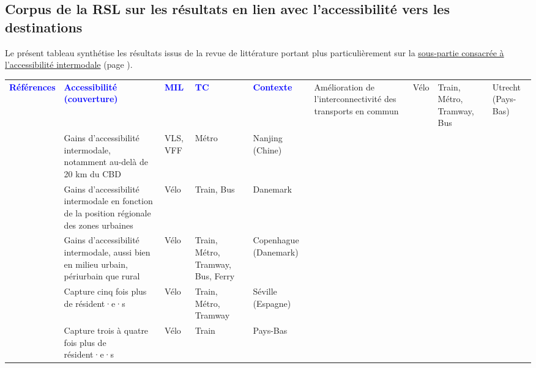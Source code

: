     \newpage
\subsection{Corpus de la \acrshort{RSL} sur les résultats en lien avec l'\gls{accessibilité} vers les destinations}
    \label{donnees-ouvertes:rsl_resultats_accessibilite_destinations}

Le présent tableau synthétise les résultats issus de la revue de littérature portant plus particulièrement sur la \hyperref[Accessibilité intermodale]{sous-partie consacrée à l'accessibilité intermodale} (page \pageref{Accessibilité intermodale}).\par

        \begin{longtable}{p{3cm}p{4cm}p{1.5cm}p{1.8cm}p{2.3cm}}
        \hline
        \textcolor{blue}{\textbf{Références}} & \textcolor{blue}{\textbf{Accessibilité (couverture)}} & \textcolor{blue}{\textbf{MIL}} & \textcolor{blue}{\textbf{TC}} & \textcolor{blue}{\textbf{Contexte}}
        \hline
        \endhead
    \small{\textcite{krygsman_multimodal_2004}} & \small{Amélioration de l'interconnectivité des transports en commun} & \small{Vélo} & \small{Train, Métro, Tramway, Bus} & \small{Utrecht (Pays-Bas)}\\
    \small{\textcite{cheng_comparison_2023}} & \small{Gains d'accessibilité intermodale, notamment au-delà de 20 km du \acrshort{CBD}} & \small{VLS, VFF} & \small{Métro} & \small{Nanjing (Chine)}\\
    \small{\textcite{nielsen_bikeability_2018}} & \small{Gains d'accessibilité intermodale en fonction de la position régionale des zones urbaines} & \small{Vélo} & \small{Train, Bus} & \small{Danemark}\\
    \small{\textcite{djurhuus_building_2016}} & \small{Gains d'accessibilité intermodale, aussi bien en milieu urbain, périurbain que rural} & \small{Vélo} & \small{Train, Métro, Tramway, Bus, Ferry} & \small{Copenhague (Danemark)}\\
    \small{\textcite{marques_potential_2017}} & \small{Capture cinq fois plus de résident·e·s} & \small{Vélo} & \small{Train, Métro, Tramway} & \small{Séville (Espagne)}\\
    \small{\textcite{kager_characterisation_2016}} & \small{Capture trois à quatre fois plus de résident·e·s} & \small{Vélo} & \small{Train} & \small{Pays-Bas}\\

\end{longtable}
